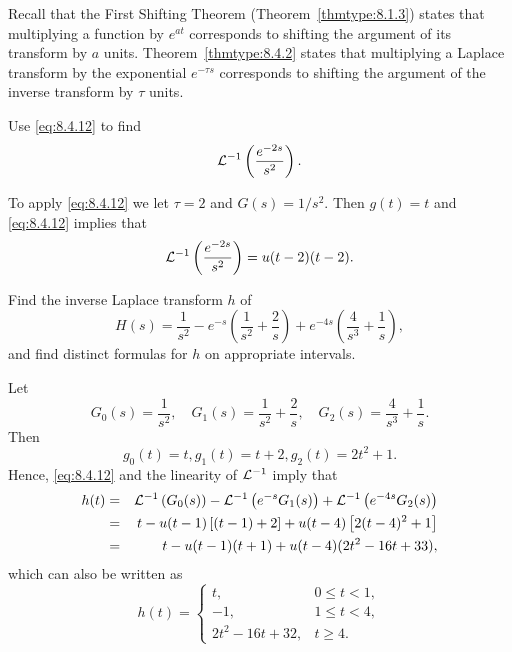 \documentclass{ximera}
\begin{document}
\begin{remark}
Recall that the First Shifting Theorem
(Theorem~\ref{thmtype:8.1.3}) states that multiplying a function  by
$e^{at}$ corresponds to shifting the argument of its transform by $a$
units. Theorem~\ref{thmtype:8.4.2} states that multiplying a Laplace
transform by the exponential $e^{-\tau s}$ corresponds to shifting the
argument of the inverse transform by $\tau$ units.
\end{remark}

\begin{example}\label{example:8.4.6}
 Use \eqref{eq:8.4.12} to find
$$
{\cal L}^{-1}\left(\frac{e^{-2s}}{s^2}\right).
$$
\begin{explanation}
To apply \eqref{eq:8.4.12} we let
$\tau=2$ and $G(s)=1/s^2$. Then $g(t)=t$ and \eqref{eq:8.4.12} implies that
$$
{\cal L}^{-1}\left(\frac{e^{-2s}}{s^2}\right)=u(t-2)(t-2).
$$
\end{explanation}
\end{example}

\begin{example}\label{example:8.4.7}
 Find the inverse Laplace transform $h$ of
$$
H(s)=\frac{1}{s^2}-e^{-s}\left(\frac{1}{s^2}+\frac{2}{s}\right)+
e^{-4s}\left(\frac{4}{s^3}+\frac{1}{s}\right),
$$
and find distinct formulas for $h$ on appropriate intervals.
\begin{explanation}
Let
$$
G_0(s)=\frac{1}{s^2},\quad G_1(s)=\frac{1}{s^2}+\frac{2}{s},\quad
G_2(s)=\frac{4}{s^3}+\frac{1}{ s}.
$$
Then
$$
g_0(t)=t, g_1(t)=t+2, g_2(t)=2t^2+1.
$$
Hence, \eqref{eq:8.4.12} and the linearity of ${\cal L}^{-1}$ imply that
\begin{eqnarray*}
h(t)&=&{\cal L}^{-1}\left(G_0(s)\right)-{\cal
L}^{-1}\left(e^{-s}G_1(s)\right)+{\cal
L}^{-1}\left(e^{-4s}G_2(s)\right)\\
&=&t-u(t-1)\left[(t-1)+2\right]+u(t-4)\left[2(t-4)^2+1\right]\\
&=&t-u(t-1)(t+1)+u(t-4)(2t^2-16t+33),
\end{eqnarray*}
which can also be written as
$$
h(t)=\left\{\begin{array}{cl}
 t,&0\leq t<1,\\
-1,&1\leq t<4,\\
2t^2-16t+32,&t\geq 4.
\end{array}\right.
$$
\end{explanation}
\end{example}
\end{document}
